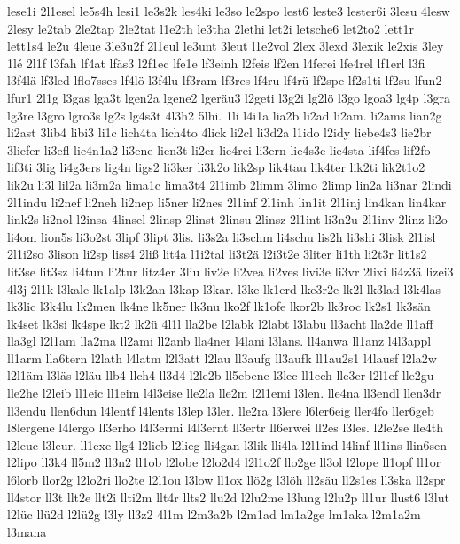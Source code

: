 {lese1i
2l1esel
le5s4h
lesi1
le3s2k
les4ki
le3so
le2spo
lest6
leste3
lester6i
3lesu
4lesw
2lesy
le2tab
2le2tap
2le2tat
l1e2th
le3tha
2lethi
let2i
letsche6
let2to2
lett1r
lett1s4
le2u
4leue
3le3u2f
2l1eul
le3unt
3leut
l1e2vol
2lex
3lexd
3lexik
le2xis
3ley
1lé
2l1f
l3fah
lf4at
lfäs3
l2f1ec
lfe1e
lf3einh
l2feis
lf2en
l4ferei
lfe4rel
lf1erl
l3fi
l3f4lä
lf3led
lflo7sses
lf4lö
l3f4lu
lf3ram
lf3res
lf4ru
lf4rü
lf2spe
lf2s1ti
lf2su
lfun2
lfur1
2l1g
l3gas
lga3t
lgen2a
lgene2
lgeräu3
l2geti
l3g2i
lg2lö
l3go
lgoa3
lg4p
l3gra
lg3re
l3gro
lgro3s
lg2s
lg4s3t
4l3h2
5lhi.
1li
l4i1a
lia2b
li2ad
li2am.
li2ams
lian2g
li2ast
3lib4
libi3
li1c
lich4ta
lich4to
4lick
li2cl
li3d2a
l1ido
l2idy
liebe4s3
lie2br
3liefer
li3efl
lie4n1a2
li3ene
lien3t
li2er
lie4rei
li3ern
lie4s3c
lie4sta
lif4fes
lif2fo
lif3ti
3lig
li4g3ers
lig4n
ligs2
li3ker
li3k2o
lik2sp
lik4tau
lik4ter
lik2ti
lik2t1o2
lik2u
li3l
lil2a
li3m2a
lima1c
lima3t4
2l1imb
2limm
3limo
2limp
lin2a
li3nar
2lindi
2l1indu
li2nef
li2neh
li2nep
li5ner
li2nes
2l1inf
2l1inh
lin1it
2l1inj
lin4kan
lin4kar
link2s
li2nol
l2insa
4linsel
2linsp
2linst
2linsu
2linsz
2l1int
li3n2u
2l1inv
2linz
li2o
li4om
lion5s
li3o2st
3lipf
3lipt
3lis.
li3s2a
li3schm
li4schu
lis2h
li3shi
3lisk
2l1isl
2l1i2so
3lison
li2sp
liss4
2liß
lit4a
l1i2tal
li3t2ä
l2i3t2e
3liter
li1th
li2t3r
lit1s2
lit3se
lit3sz
li4tun
li2tur
litz4er
3liu
liv2e
li2vea
li2ves
livi3e
li3vr
2lixi
li4z3ä
lizei3
4l3j
2l1k
l3kale
lk1alp
l3k2an
l3kap
l3kar.
l3ke
lk1erd
lke3r2e
lk2l
lk3lad
l3k4las
lk3lic
l3k4lu
lk2men
lk4ne
lk5ner
lk3nu
lko2f
lk1ofe
lkor2b
lk3roc
lk2s1
lk3sän
lk4set
lk3si
lk4spe
lkt2
lk2ü
4l1l
lla2be
l2labk
l2labt
l3labu
ll3acht
lla2de
ll1aff
lla3gl
l2l1am
lla2ma
ll2ami
ll2anb
lla4ner
l4lani
l3lans.
ll4anwa
ll1anz
l4l3appl
ll1arm
lla6tern
l2lath
l4latm
l2l3att
l2lau
ll3aufg
ll3aufk
ll1au2s1
l4lausf
l2la2w
l2l1äm
l3läs
l2läu
llb4
llch4
ll3d4
l2le2b
ll5ebene
l3lec
ll1ech
lle3er
l2l1ef
lle2gu
lle2he
l2leib
ll1eic
ll1eim
l4l3eise
lle2la
lle2m
l2l1emi
l3len.
lle4na
ll3endl
llen3dr
ll3endu
llen6dun
l4lentf
l4lents
l3lep
l3ler.
lle2ra
l3lere
l6ler6eig
ller4fo
ller6geb
l8lergene
l4lergo
ll3erho
l4l3ermi
l4l3ernt
ll3ertr
ll6erwei
ll2es
l3les.
l2le2se
lle4th
l2leuc
l3leur.
ll1exe
llg4
l2lieb
l2lieg
lli4gan
l3lik
lli4la
l2l1ind
l4linf
ll1ins
llin6sen
l2lipo
ll3k4
ll5m2
ll3n2
ll1ob
l2lobe
l2lo2d4
l2l1o2f
llo2ge
ll3ol
l2lope
ll1opf
ll1or
l6lorb
llor2g
l2lo2ri
llo2te
l2l1ou
l3low
ll1ox
llö2g
l3löh
ll2säu
ll2s1es
ll3ska
ll2spr
ll4stor
ll3t
llt2e
llt2i
llti2m
llt4r
llts2
llu2d
l2lu2me
l3lung
l2lu2p
ll1ur
llust6
l3lut
l2lüc
llü2d
l2lü2g
l3ly
ll3z2
4l1m
l2m3a2b
l2m1ad
lm1a2ge
lm1aka
l2m1a2m
l3mana
}
